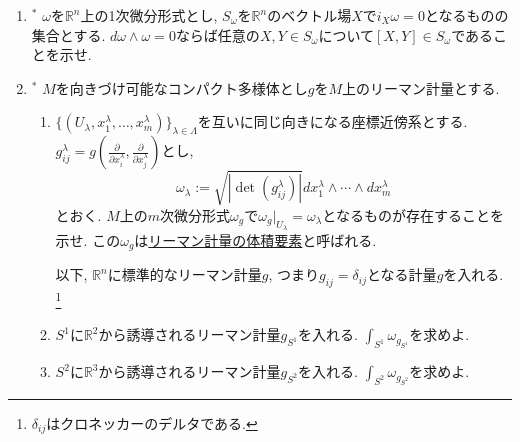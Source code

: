 \documentclass[dvipdfmx,a4paper,11pt]{article}
\newcommand{\R}{\mathbb{R}}
\theoremstyle{definition}
\newcommand{\pdrv}[2]{\frac{\partial #1}{\partial #2}}
\begin{document}
\begin{enumerate}[label=\textbf{問}3.\arabic*]
\item $^{*}$ $\omega$を$\R^n$上の1次微分形式とし, $S_{\omega}$を$\R^n$のベクトル場$X$で$i_{X}\omega =0$となるものの集合とする.  $d \omega \wedge \omega =0$ならば任意の$X,Y \in S_{\omega}$について$[X,Y] \in S_{\omega}$であることを示せ.

\item $^{*}$ $M$を向きづけ可能なコンパクト多様体とし$g$を$M$上のリーマン計量とする. 

\begin{enumerate}
 \setlength{\parskip}{0cm}
  \setlength{\itemsep}{2pt} 
\item $\{ (U_{\lambda}, x_{1}^{\lambda}, \ldots, x_{m}^{\lambda})\}_{\lambda \in \Lambda}$を互いに同じ向きになる座標近傍系とする. 
$g_{ij}^{\lambda} =g \left(\pdrv{}{x_{i}^{\lambda}}, \pdrv{}{x_{j}^{\lambda}}\right)$とし, 
$$
\omega_{\lambda} := \sqrt{\left|\det (g_{ij}^{\lambda}) \right|} dx_{1}^{\lambda} \wedge \cdots \wedge d x_{m}^{\lambda}
$$
とおく. $M$上の$m$次微分形式$\omega_{g}$で$\omega_{g}|_{U_{\lambda}} = \omega_{\lambda} $となるものが存在することを示せ. この$\omega_g$は\underline{リーマン計量の体積要素}と呼ばれる.

\hspace{-33pt}以下, $\R^n$に標準的なリーマン計量$g$, つまり$g_{ij} = \delta_{ij}$となる計量$g$を入れる. \footnote{$\delta_{ij}$はクロネッカーのデルタである.}

\item $S^1$に$\R^2$から誘導されるリーマン計量$g_{S^1}$を入れる. $\int_{S^1} \omega_{g_{S^1}}$を求めよ.

\item $S^2$に$\R^3$から誘導されるリーマン計量$g_{S^2}$を入れる. $\int_{S^2} \omega_{g_{S^2}}$を求めよ.



\end{enumerate}
\end{enumerate}
\end{document}
